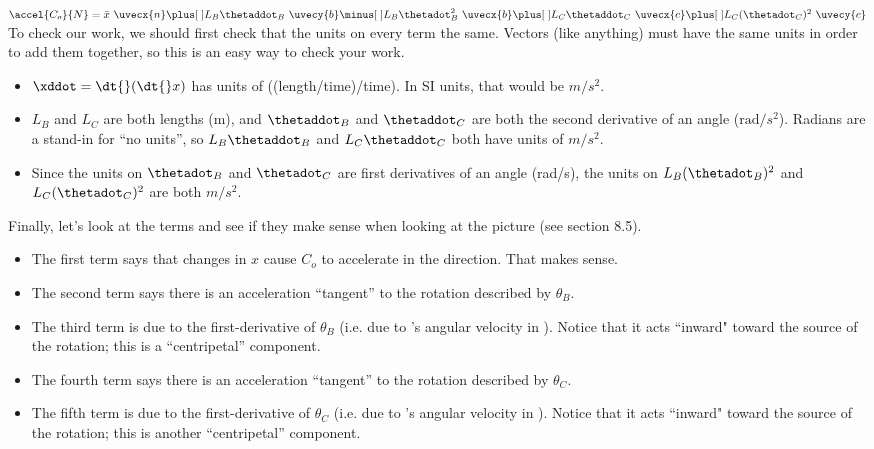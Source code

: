 \begin{enumerate}
{$\accel{C_o}{N} = \ddot{x}~\uvecx{n} \plus[\;] L_B \thetaddot_B ~\uvecy{b} \minus[\;] L_B \thetadot_B^2 ~\uvecx{b} \plus[\;] L_C \thetaddot_C ~\uvecx{c} \plus[\;] L_C (\thetadot_C)^2 ~\uvecy{c}$
\\[1.0pc]
To check our work, we should first check that the units on every term the same. Vectors (like anything) must have the same units in order to add them together, so this is an easy way to check your work.
\begin{itemize}
\item $\xddot = \dt{}(\dt{}x)$ has units of ((length/time)/time). In SI units, that would be $m/s^2$.
\item $L_B$ and $L_C$ are both lengths (m), and $\thetaddot_B$ and $\thetaddot_C$ are both the second derivative of an angle ($\mathrm{rad}/s^2$).
Radians are a stand-in for ``no units'', so $L_B \thetaddot_B$ and $L_C \thetaddot_C$ both have units of $m/s^2$.
\item Since the units on $\thetadot_B$ and $\thetadot_C$ are first derivatives of an angle (rad/s),
the units on $L_B (\thetadot_B)^2$ and $L_C (\thetadot_C)^2$ are both $m/s^2$.
\end{itemize}
\vspace{0.5pc}
Finally, let's look at the terms and see if they make sense when looking at the picture (see section 8.5).
\begin{itemize}
\item The first term says that changes in $x$ cause $C_o$ to accelerate in the  direction. That makes sense.
\item The second term says there is an acceleration ``tangent'' to the rotation described by $\theta_B$.
\item The third term is due to the first-derivative of $\theta_B$ (i.e. due to 's angular velocity in ). Notice that it acts ``inward" toward the source of the rotation; this is a ``centripetal'' component.
\item The fourth term says there is an acceleration ``tangent'' to the rotation described by $\theta_C$.
\item The fifth term is due to the first-derivative of $\theta_C$ (i.e. due to 's angular velocity in ). Notice that it acts ``inward" toward the source of the rotation; this is another ``centripetal'' component.
\end{itemize}
}{
}
\end{enumerate}

